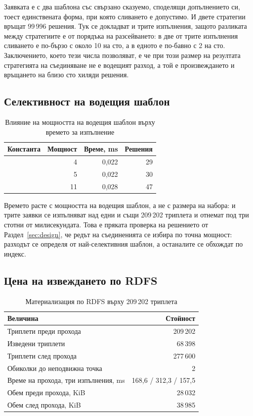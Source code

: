 Заявката е с два шаблона със свързано сказуемо, споделящи допълнението си, тоест
единствената форма, при която сливането е допустимо. И двете стратегии връщат 99\,996
решения. Тук се докладват и трите изпълнения, защото разликата между стратегиите е от
порядъка на разсейването: в две от трите изпълнения сливането е по-бързо с около 10 на сто,
а в едното е по-бавно с 2 на сто. Заключението, което тези числа позволяват, е че при
този размер на резултата стратегията на съединяване не е водещият разход, а той е
произвеждането и връщането на близо сто хиляди решения.

\subsection{Селективност на водещия шаблон}

\begin{table}[H]
\caption{Влияние на мощността на водещия шаблон върху времето за изпълнение}
\label{tab:selectivity}
\centering
\fontsize{10}{12}\selectfont
\begin{tabular}{@{}L{3.0cm}rrr@{}}
\toprule
\textbf{Константа} & \textbf{Мощност} & \textbf{Време, ms} & \textbf{Решения} \\
\midrule
{} &  4 & 0{,}022 & 29 \\
 &  5 & 0{,}022 & 30 \\
 & 11 & 0{,}028 & 47 \\
\bottomrule
\end{tabular}
\end{table}

Времето расте с мощността на водещия шаблон, а не с размера на набора: и трите заявки се
изпълняват над едни и същи 209\,202 триплета и отнемат под три стотни от милисекундата.
Това е пряката проверка на решението от Раздел~\ref{sec:design}, че редът на съединенията
се избира по точна мощност: разходът се определя от най-селективния шаблон, а останалите
се обхождат по индекс.

\subsection{Цена на извеждането по RDFS}

\begin{table}[H]
\caption{Материализация по RDFS върху 209\,202 триплета}
\label{tab:rdfs}
\centering
\fontsize{10}{12}\selectfont
\begin{tabular}{@{}L{6.6cm}r@{}}
\toprule
\textbf{Величина} & \textbf{Стойност} \\
\midrule
Триплети преди прохода & 209\,202 \\
Изведени триплети & 68\,398 \\
Триплети след прохода & 277\,600 \\
Обиколки до неподвижна точка & 2 \\
Време на прохода, три изпълнения, ms & 168{,}6 / 312{,}3 / 157{,}5 \\
Обем преди прохода, KiB & 28\,032 \\
Обем след прохода, KiB & 38\,985 \\
\bottomrule
\end{tabular}
\end{table}

